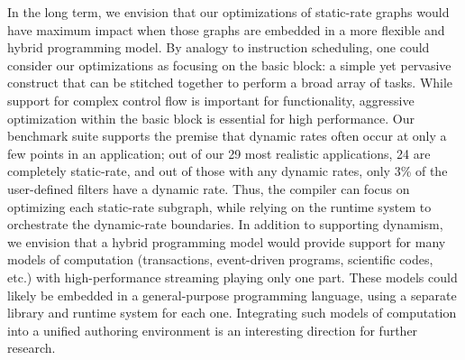 In the long term, we envision that our optimizations of static-rate
graphs would have maximum impact when those graphs are embedded in a
more flexible and hybrid programming model.  By analogy to instruction
scheduling, one could consider our optimizations as focusing on the
basic block: a simple yet pervasive construct that can be stitched
together to perform a broad array of tasks.  While support for complex
control flow is important for functionality, aggressive optimization
within the basic block is essential for high performance.  Our
benchmark suite supports the premise that dynamic rates often occur at
only a few points in an application; out of our 29 most realistic
applications, 24 are completely static-rate, and out of those with any
dynamic rates, only 3\% of the user-defined filters have a dynamic
rate.  Thus, the compiler can focus on optimizing each static-rate
subgraph, while relying on the runtime system to orchestrate the
dynamic-rate boundaries.  In addition to supporting dynamism, we
envision that a hybrid programming model would provide support for
many models of computation (transactions, event-driven programs,
scientific codes, etc.) with high-performance streaming playing only
one part.  These models could likely be embedded in a general-purpose
programming language, using a separate library and runtime system for
each one.  Integrating such models of computation into a unified
authoring environment is an interesting direction for further
research.

